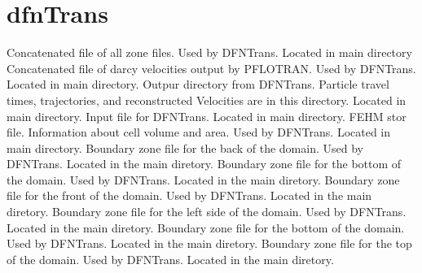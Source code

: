 \documentclass[letterpaper,10pt,english]{sphinxmanual}
\begin{document}
\section{dfnTrans}
\label{output:dfntrans}\label{output:allboundaries-zone}
Concatenated file of all zone files. Used by DFNTrans. Located in main directory
\label{output:darcyvel-dat}
Concatenated file of darcy velocities output by PFLOTRAN. Used by DFNTrans. Located in main directory.
\label{output:dfntrans-output-dir}
Outpur directory from DFNTrans. Particle travel times, trajectories, and reconstructed Velocities are in this directory. Located in main directory.
\label{output:ptdfn-control-dat}
Input file for DFNTrans. Located in main directory.
\label{output:id4}
FEHM stor file. Information about cell volume and area. Used by DFNTrans. Located in main directory.
\label{output:pboundary-back-n-zone}
Boundary zone file for the back of the domain. Used by DFNTrans. Located in the main diretory.
\label{output:pboundary-bottom-zone}
Boundary zone file for the bottom of the domain. Used by DFNTrans. Located in the main diretory.
\label{output:pboundary-front-s-zone}
Boundary zone file for the front of the domain. Used by DFNTrans. Located in the main diretory.
\label{output:pboundary-left-w-zone}
Boundary zone file for the left side of the domain. Used by DFNTrans. Located in the main diretory.
\label{output:pboundary-right-e-zone}
Boundary zone file for the bottom of the domain. Used by DFNTrans. Located in the main diretory.
\label{output:pboundary-top-zone}
Boundary zone file for the top of the domain. Used by DFNTrans. Located in the main diretory.
\end{document}
